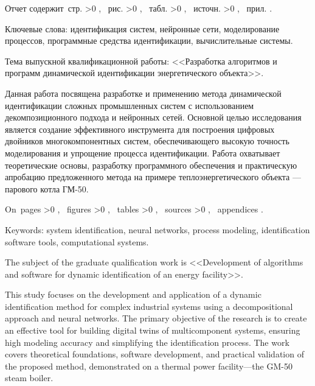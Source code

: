 \begin{Referat}

    Отчет содержит \pageref{LastPage}\,стр.%
    \ifnum \totfig >0 , \totfig~рис.%
    \fi
    \ifnum \tottab >0 , \tottab~табл.%
    \fi
    \ifnum \totbib >0 , \totbib~источн.%
    \fi
    \ifnum \totapp >0 , \totapp~прил.%
    \else
    .%
    \fi

    Ключевые слова: идентификация систем, нейронные сети, моделирование
    процессов, программные средства идентификации, вычислительные системы.

    Тема выпускной квалификационной работы: <<Разработка алгоритмов и программ
    динамической идентификации энергетического объекта>>.

    Данная работа посвящена разработке и применению метода динамической
    идентификации сложных промышленных систем с использованием декомпозиционного
    подхода и нейронных сетей. Основной целью исследования является создание
    эффективного инструмента для построения цифровых двойников многокомпонентных
    систем, обеспечивающего высокую точность моделирования и упрощение процесса
    идентификации. Работа охватывает теоретические основы, разработку
    программного обеспечения и практическую апробацию предложенного метода на
    примере теплоэнергетического объекта — парового котла ГМ-50. 
    \nocite{*}

\end{Referat}



\begin{ReferatEng}

    On \pageref{LastPage}\,pages%
    \ifnum \totfig >0 , \totfig~figures%
    \fi
    \ifnum \tottab >0 , \tottab~tables%
    \fi
    \ifnum \totbib >0 , \totbib~sources%
    \fi
    \ifnum \totapp >0 , \totapp~appendices%
    \else
    .%
    \fi

    Keywords: system identification, neural networks, process modeling,
    identification software tools, computational systems.

    The subject of the graduate qualification work is <<Development of
    algorithms and software for dynamic identification of an energy facility>>.

    This study focuses on the development and application of a dynamic
    identification method for complex industrial systems using a decompositional
    approach and neural networks. The primary objective of the research is to
    create an effective tool for building digital twins of multicomponent
    systems, ensuring high modeling accuracy and simplifying the identification
    process. The work covers theoretical foundations, software development, and
    practical validation of the proposed method, demonstrated on a thermal power
    facility—the GM-50 steam boiler.

\end{ReferatEng}